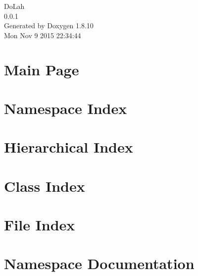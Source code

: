 \documentclass[twoside]{book}
\newcommand{\+}{\discretionary{\mbox{\scriptsize$\hookleftarrow$}}{}{}}
\newcommand{\clearemptydoublepage}{%
  \newpage{\pagestyle{empty}\cleardoublepage}%
}
\begin{document}
\hypersetup{pageanchor=false,
             bookmarks=true,
             bookmarksnumbered=true,
             pdfencoding=unicode
            }
\begin{titlepage}
\vspace*{7cm}
\begin{center}%
{\Large Do\+Lah \\[1ex]\large 0.\+0.\+1 }\\
\vspace*{1cm}
{\large Generated by Doxygen 1.8.10}\\
\vspace*{0.5cm}
{\small Mon Nov 9 2015 22:34:44}\\
\end{center}
\end{titlepage}
\clearemptydoublepage
\tableofcontents
\clearemptydoublepage
{}
\hypersetup{pageanchor=true}

\chapter{Main Page}
\label{index}\hypertarget{index}{}
\chapter{Namespace Index}

\chapter{Hierarchical Index}

\chapter{Class Index}

\chapter{File Index}

\chapter{Namespace Documentation}


\end{document}
